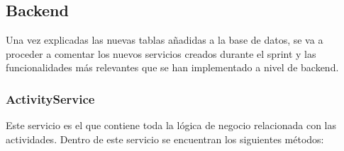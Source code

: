 \subsection{Backend}

Una vez explicadas las nuevas tablas añadidas a la base de datos, se va a proceder a comentar los nuevos servicios creados durante el sprint y las funcionalidades más relevantes que se han implementado a nivel de backend.

\subsubsection{ActivityService}

Este servicio es el que contiene toda la lógica de negocio relacionada con las actividades. Dentro de este servicio se encuentran los siguientes métodos:

